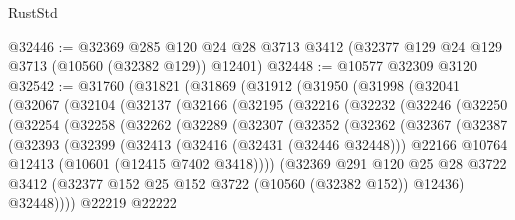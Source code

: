 \begin{lexlean}{RustStd}
\begin{coremodule}
@32446 := @32369
    @285
    @120
    @24
    @28
    @3713
    @3412
    (@32377 @129 @24 @129 @3713 (@10560 (@32382 @129)) @12401)
@32448 := @10577 @32309 @3120
@32542 := @31760
    (@31821
      (@31869
        (@31912
          (@31950
            (@31998
              (@32041
                (@32067
                  (@32104
                    (@32137
                      (@32166
                        (@32195
                          (@32216
                            (@32232
                              (@32246
                                (@32250
                                  (@32254
                                    (@32258
                                      (@32262
                                        (@32289
                                          (@32307
                                            (@32352
                                              (@32362
                                                (@32367
                                                  (@32387
                                                    (@32393
                                                      (@32399
                                                        (@32413
                                                          (@32416 (@32431 (@32446 @32448)))
                                                          @22166
                                                          @10764
                                                          @12413
                                                          (@10601 (@12415 @7402 @3418))))
                                                      (@32369
                                                        @291
                                                        @120
                                                        @25
                                                        @28
                                                        @3722
                                                        @3412
                                                        (@32377
                                                          @152
                                                          @25
                                                          @152
                                                          @3722
                                                          (@10560 (@32382 @152))
                                                          @12436)
                                                        @32448))))
                                                @22219
                                                @22222

\end{coremodule}
\end{lexlean}
